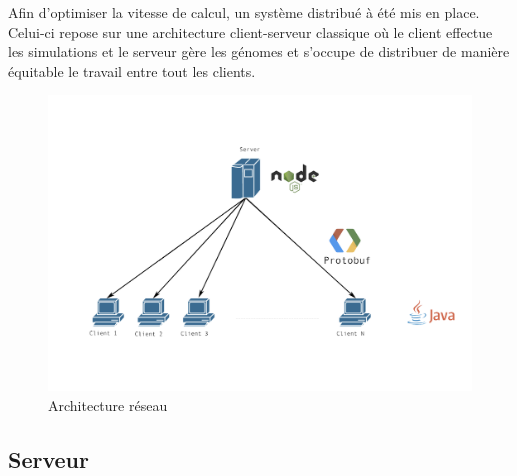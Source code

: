\documentclass{article}
\begin{document}
Afin d'optimiser la vitesse de calcul, un système distribué à été mis en place. Celui-ci repose sur une architecture client-serveur classique où le client effectue les simulations et le serveur gère les génomes et s'occupe de distribuer de manière équitable le travail entre tout les clients.\\

\begin{figure}[H]
\begin{center}
	\includegraphics[scale=0.5]{archnet.png}
	\caption{Architecture réseau}
\end{center}
\end{figure}

\subsection{Serveur}
\end{document}

